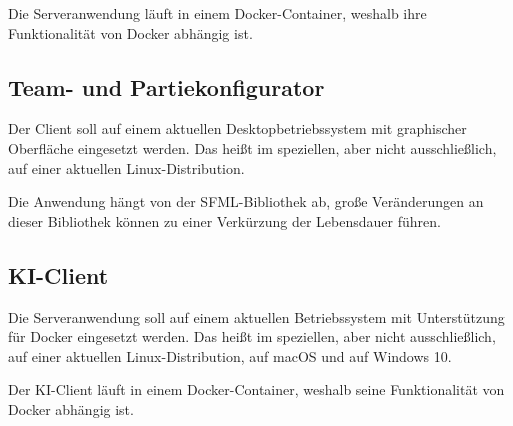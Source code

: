 Die Serveranwendung läuft in einem Docker-Container, weshalb ihre Funktionalität von Docker abhängig ist.

\subsection{Team- und Partiekonfigurator}
Der Client soll auf einem aktuellen Desktopbetriebssystem mit graphischer Oberfläche eingesetzt werden. Das heißt im speziellen, aber nicht ausschließlich, auf einer aktuellen Linux-Distribution.

Die Anwendung hängt von der SFML-Bibliothek ab, große Veränderungen an dieser Bibliothek können zu einer Verkürzung der Lebensdauer führen.

\subsection{KI-Client}
Die Serveranwendung soll auf einem aktuellen Betriebssystem mit Unterstützung für Docker eingesetzt werden. Das heißt im speziellen, aber nicht ausschließlich, auf einer aktuellen Linux-Distribution, auf macOS und auf Windows 10.

Der KI-Client läuft in einem Docker-Container, weshalb seine Funktionalität von Docker abhängig ist.
